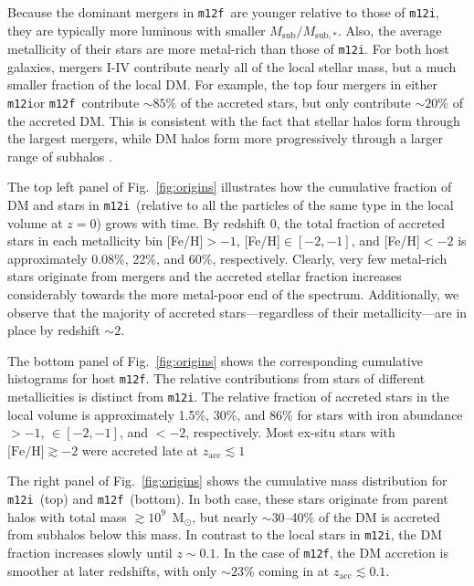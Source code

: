\documentclass[twocolumn,preprintnumbers]{aastex6}
\newcommand{\FeH}{\text{[Fe/H]} }
\newcommand{\zacc}{z_\mathrm{acc}}
\def\ML#1{\textcolor{red}{[ML: #1]}}
\newcommand{\mi}{\texttt{m12i}}
\newcommand{\mf}{\texttt{m12f}}
\begin{document}
Because the dominant mergers in \mf~are younger relative to those of \mi, they are typically more luminous with smaller $M_\mathrm{sub}/M_\mathrm{sub,*}$.  Also, the average metallicity of their stars are more metal-rich than those of \mi.  For both host galaxies, mergers I-IV contribute nearly all of the local stellar mass, but a much smaller fraction of the local DM.  For example, the top four mergers in either \mi or \mf~contribute $\sim85\%$ of the accreted stars, but only contribute $\sim20\%$ of the accreted DM. This is consistent with the fact that stellar halos form through the largest mergers, while DM halos form more progressively through a larger range of subhalos \citep{}.

The top left panel of Fig.~\ref{fig:origins} illustrates how the cumulative fraction of DM and stars in \mi~(relative to all the particles of the same type in the local volume at $z=0$) grows with time.  By redshift 0, the total fraction of accreted stars in each metallicity bin [Fe/H]$>-1$,  [Fe/H]$\in [-2, -1]$, and [Fe/H]$<-2$ is approximately 0.08\%, 22\%, and 60\%, respectively.  Clearly, very few metal-rich stars originate from mergers and the accreted stellar fraction increases considerably towards the more metal-poor end of the spectrum.   Additionally, we observe that the majority of accreted stars---regardless of their metallicity---are in place by redshift $\sim2$. 

The bottom panel of Fig.~\ref{fig:origins} shows the corresponding cumulative histograms for host \texttt{m12f}.  The relative contributions from stars of different metallicities is distinct from \texttt{m12i}.  The relative fraction of accreted stars in the local volume is approximately 1.5\%, 30\%, and 86\% for stars with iron abundance $>-1$, $\in [-2, -1]$, and $<-2$, respectively.  Most ex-situ stars with $\FeH \gtrsim -2$ were accreted late at $\zacc \lesssim 1$ 

The right panel of Fig.~\ref{fig:origins} shows the cumulative mass distribution for \mi~(top) and \mf~(bottom).  In both case, these stars originate from parent halos with total mass $\gtrsim 10^9$~M$_\odot$, but nearly $\sim 30$--40\% of the DM is accreted from subhalos below this mass.  In contrast to the local stars in \mi, the DM fraction increases slowly until $z\sim0.1$.  %
In the case of \mf, the DM accretion is smoother at later redshifts, with only $\sim23\%$ coming in at $\zacc \lesssim 0.1$.  
\end{document}
